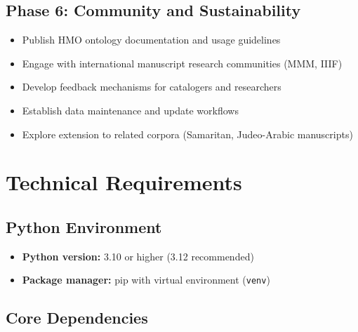 \documentclass[12pt]{article}
\newcommand{\code}[1]{\texttt{#1}}
\begin{document}
\subsection{Phase 6: Community and Sustainability}

\begin{itemize}
\item Publish HMO ontology documentation and usage guidelines
\item Engage with international manuscript research communities (MMM, IIIF)
\item Develop feedback mechanisms for catalogers and researchers
\item Establish data maintenance and update workflows
\item Explore extension to related corpora (Samaritan, Judeo-Arabic manuscripts)
\end{itemize}


\section{Technical Requirements}
\label{sec:requirements}

\subsection{Python Environment}

\begin{itemize}
\item \textbf{Python version:} 3.10 or higher (3.12 recommended)
\item \textbf{Package manager:} pip with virtual environment (\code{venv})
\end{itemize}

\subsection{Core Dependencies}
\end{document}
